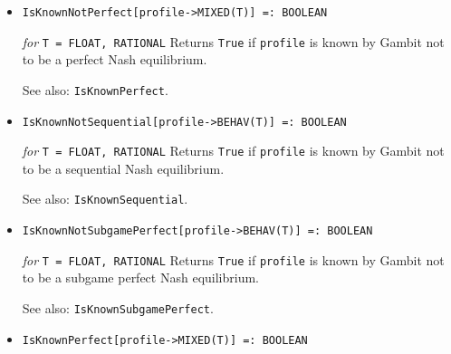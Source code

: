 \begin{itemize}
\item{}
\protect \large \begin{verbatim}
IsKnownNotPerfect[profile->MIXED(T)] =: BOOLEAN
\end{verbatim}\normalsize

{\it for} {\tt T = FLOAT, RATIONAL}
\bd
Returns \verb+True+ if \verb+profile+
is known by Gambit not to be a perfect Nash equilibrium.
\item [See also:] \verb+IsKnownPerfect+.
\ed

\item{}
\protect \large \begin{verbatim}
IsKnownNotSequential[profile->BEHAV(T)] =: BOOLEAN
\end{verbatim}\normalsize

{\it for} {\tt T = FLOAT, RATIONAL}
\bd
Returns \verb+True+ if \verb+profile+
is known by Gambit not to be a sequential Nash
equilibrium.
\item [See also:] \verb+IsKnownSequential+.
\ed



\item{}
\protect \large \begin{verbatim}
IsKnownNotSubgamePerfect[profile->BEHAV(T)] =: BOOLEAN
\end{verbatim}\normalsize

{\it for} {\tt T = FLOAT, RATIONAL}
\bd
Returns \verb+True+ if \verb+profile+
is known by Gambit not to be a subgame perfect Nash equilibrium.
\item [See also:] \verb+IsKnownSubgamePerfect+.
\ed

\item{}
\protect \large \begin{verbatim}
IsKnownPerfect[profile->MIXED(T)] =: BOOLEAN
\end{verbatim}\normalsize


\end{itemize}
